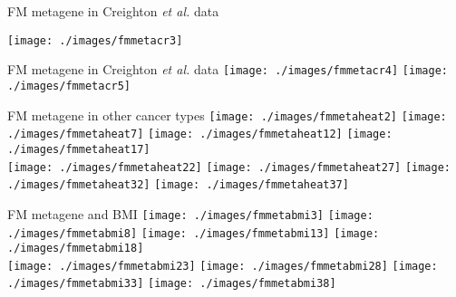 \documentclass[handout]{beamer}
\begin{document}

\begin{frame}{FM metagene in Creighton \textit{et al.} data}
	\begin{center}
		\texttt{[image: ./images/fmmetacr3]}
	\end{center}
\end{frame}

\begin{frame}{FM metagene in Creighton \textit{et al.} data}
	\texttt{[image: ./images/fmmetacr4]}
	\texttt{[image: ./images/fmmetacr5]}
\end{frame}

\begin{frame}{FM metagene in other cancer types}
	\texttt{[image: ./images/fmmetaheat2]}
	\texttt{[image: ./images/fmmetaheat7]}
	\texttt{[image: ./images/fmmetaheat12]}
	\texttt{[image: ./images/fmmetaheat17]}\\
	\texttt{[image: ./images/fmmetaheat22]}
	\texttt{[image: ./images/fmmetaheat27]}
	\texttt{[image: ./images/fmmetaheat32]}
	\texttt{[image: ./images/fmmetaheat37]}
\end{frame}

\begin{frame}{FM metagene and BMI}
	\texttt{[image: ./images/fmmetabmi3]}
	\texttt{[image: ./images/fmmetabmi8]}
	\texttt{[image: ./images/fmmetabmi13]}
	\texttt{[image: ./images/fmmetabmi18]}\\
	\texttt{[image: ./images/fmmetabmi23]}
	\texttt{[image: ./images/fmmetabmi28]}
	\texttt{[image: ./images/fmmetabmi33]}
	\texttt{[image: ./images/fmmetabmi38]}
\end{frame}
\end{document}
